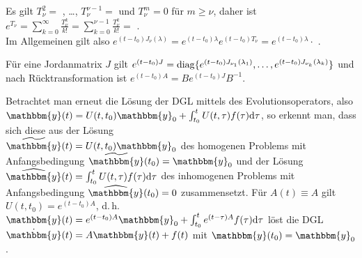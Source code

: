 Es gilt $T_\nu^2 = $ , \dots,
$T_\nu^{\nu-1} = $ 
und $T_\nu^m = 0$ für $m \ge \nu$, daher ist
$e^{T_\nu} = \sum_{k=0}^\infty \frac{T_\nu^k}{k!}
= \sum_{k=0}^{\nu-1} \frac{T_\nu^k}{k!} = $ . \\
Im Allgemeinen gilt also
$e^{(t - t_0) J_\nu(\lambda)} = e^{(t - t_0) \lambda} e^{(t - t_0) T_\nu} =
e^{(t - t_0) \lambda} \cdot $ .

Für eine Jordanmatrix $J$ gilt
$e^{(t - t_0) J} = \operatorname{diag}\{e^{(t - t_0) J_{\nu_1}(\lambda_1)}, \dotsc,
e^{(t - t_0) J_{\nu_k}(\lambda_k)}\}$
und nach Rücktransformation ist
$e^{(t - t_0) A} = B e^{(t - t_0) J} B^{-1}$.

\linie

Betrachtet man erneut die Lösung der DGL mittels des Evolutionsoperators,
also \\
$\mathbbm{y}(t) = U(t, t_0) \mathbbm{y}_0 +
\int_{t_0}^t U(t, \tau) f(\tau) \d\tau$,
so erkennt man, dass sich diese aus der Lösung \\
$\widetilde{\mathbbm{y}}(t) = U(t, t_0) \mathbbm{y}_0$
des homogenen Problems mit Anfangsbedingung
$\widetilde{\mathbbm{y}}(t_0) = \mathbbm{y}_0$ und der Lösung \\
$\widehat{\mathbbm{y}}(t) = \int_{t_0}^t U(t, \tau) f(\tau) \d\tau$
des inhomogenen Problems mit
Anfangsbedingung $\widehat{\mathbbm{y}}(t_0) = 0$ zusammensetzt.
Für $A(t) \equiv A$ gilt $U(t, t_0) = e^{(t - t_0) A}$, d.\,h.
$\mathbbm{y}(t) = e^{(t - t_0) A} \mathbbm{y}_0 +
\int_{t_0}^t e^{(t - \tau) A} f(\tau) \d\tau$
löst die DGL $\dot{\mathbbm{y}}(t) = A \mathbbm{y}(t) + f(t)$
mit $\mathbbm{y}(t_0) = \mathbbm{y}_0$.

